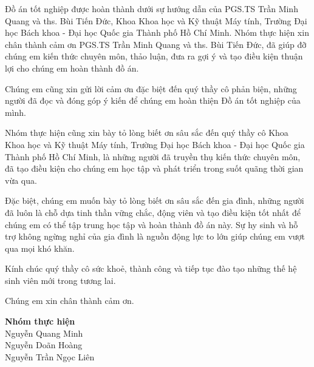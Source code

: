Đồ án tốt nghiệp được hoàn thành dưới sự hướng dẫn của PGS.TS Trần Minh Quang và \acrshort{ths}. Bùi Tiến Đức, Khoa Khoa học và Kỹ thuật Máy tính, Trường Đại học Bách khoa - Đại học Quốc gia Thành phố Hồ Chí Minh. Nhóm thực hiện xin chân thành cảm ơn PGS.TS Trần Minh Quang và \acrshort{ths}. Bùi Tiến Đức, đã giúp đỡ chúng em kiến thức chuyên môn, thảo luận, đưa ra gợi ý và tạo điều kiện thuận lợi cho chúng em hoàn thành đồ án.

Chúng em cũng xin gửi lời cảm ơn đặc biệt đến quý thầy cô phản biện, những người đã đọc và đóng góp ý kiến để chúng em hoàn thiện Đồ án tốt nghiệp của mình.

Nhóm thực hiện cũng xin bày tỏ lòng biết ơn sâu sắc đến quý thầy cô Khoa Khoa học và Kỹ thuật Máy tính, Trường Đại học Bách khoa - Đại học Quốc gia Thành phố Hồ Chí Minh, là những người đã truyền thụ kiến thức chuyên môn, đã tạo điều kiện cho chúng em học tập và phát triển trong suốt quãng thời gian vừa qua.

Đặc biệt, chúng em muốn bày tỏ lòng biết ơn sâu sắc đến gia đình, những người đã luôn là chỗ dựa tinh thần vững chắc, động viên và tạo điều kiện tốt nhất để chúng em có thể tập trung học tập và hoàn thành đồ án này. Sự hy sinh và hỗ trợ không ngừng nghỉ của gia đình là nguồn động lực to lớn giúp chúng em vượt qua mọi khó khăn.

Kính chúc quý thầy cô sức khoẻ, thành công và tiếp tục đào tạo những thế hệ sinh viên mới trong tương lai.

Chúng em xin chân thành cảm ơn.

\begin{flushright}
    \textbf{Nhóm thực hiện}\\
    Nguyễn Quang Minh \\
    Nguyễn Doãn Hoàng \\
    Nguyễn Trần Ngọc Liên \\
\end{flushright}
